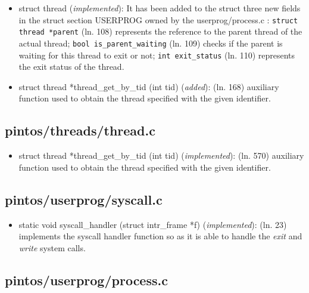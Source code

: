 \documentclass[11pt]{scrartcl}
\begin{document}
\begin{itemize}
	\item struct thread (\textit{implemented}):\newline
    It has been added to the struct three new fields in the struct section USERPROG owned by the userprog/process.c : \texttt{struct thread *parent} (ln. 108) represents the reference to the parent thread of the actual thread; \texttt{bool is\_parent\_waiting} (ln. 109) checks if the parent is waiting for this thread to exit or not; 
		\texttt{int exit\_status} (ln. 110) represents the exit status of the thread.
	\item struct thread *thread\_get\_by\_tid (int tid) (\textit{added}):\newline
	(ln. 168) auxiliary function used to obtain the thread specified with the given identifier.
    
\end{itemize}

\subsection*{pintos/threads/thread.c}

\begin{itemize}
	\item struct thread *thread\_get\_by\_tid (int tid) (\textit{implemented}):\newline
	(ln. 570) auxiliary function used to obtain the thread specified with the given identifier.
\end{itemize}

\subsection*{pintos/userprog/syscall.c}

\begin{itemize}
	\item static void syscall\_handler (struct intr\_frame *f) (\textit{implemented}):\newline
	(ln. 23) implements the syscall handler function so as it is able to handle the \textit{exit} and \textit{write} system calls.
\end{itemize}

\subsection*{pintos/userprog/process.c}
\end{document}
